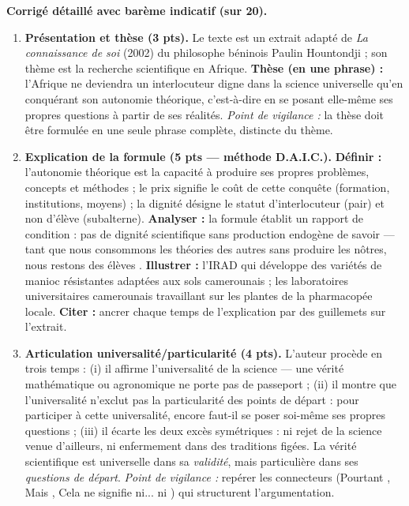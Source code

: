 \documentclass[11pt]{article}
\begin{document}
\begin{exoresolu}
\textbf{Corrigé détaillé avec barème indicatif (sur 20).}

\begin{enumerate}
\item \textbf{Présentation et thèse (3 pts).} Le texte est un extrait adapté de \emph{La connaissance de soi} (2002) du philosophe béninois Paulin Hountondji ; son thème est la recherche scientifique en Afrique. \textbf{Thèse (en une phrase) :} l'Afrique ne deviendra un interlocuteur digne dans la science universelle qu'en conquérant son autonomie théorique, c'est-à-dire en se posant elle-même ses propres questions à partir de ses réalités. \emph{Point de vigilance :} la thèse doit être formulée en une seule phrase complète, distincte du thème.
\item \textbf{Explication de la formule (5 pts — méthode D.A.I.C.).} \textbf{Définir :} l'\og autonomie théorique \fg est la capacité à produire ses propres problèmes, concepts et méthodes ; le \og prix \fg signifie le coût de cette conquête (formation, institutions, moyens) ; la \og dignité \fg désigne le statut d'interlocuteur (pair) et non d'élève (subalterne). \textbf{Analyser :} la formule établit un rapport de condition : pas de dignité scientifique sans production endogène de savoir — \og tant que nous consommons les théories des autres sans produire les nôtres, nous restons des élèves \fg. \textbf{Illustrer :} l'IRAD qui développe des variétés de manioc résistantes adaptées aux sols camerounais ; les laboratoires universitaires camerounais travaillant sur les plantes de la pharmacopée locale. \textbf{Citer :} ancrer chaque temps de l'explication par des guillemets sur l'extrait.
\item \textbf{Articulation universalité/particularité (4 pts).} L'auteur procède en trois temps : (i) il affirme l'universalité de la science — \og une vérité mathématique ou agronomique ne porte pas de passeport \fg ; (ii) il montre que l'universalité n'exclut pas la particularité des points de départ : \og pour participer à cette universalité, encore faut-il se poser soi-même ses propres questions \fg ; (iii) il écarte les deux excès symétriques : ni rejet de la science venue d'ailleurs, ni enfermement dans des traditions figées. La vérité scientifique est universelle dans sa \emph{validité}, mais particulière dans ses \emph{questions de départ}. \emph{Point de vigilance :} repérer les connecteurs (\og Pourtant \fg, \og Mais \fg, \og Cela ne signifie ni... ni \fg) qui structurent l'argumentation.

\end{enumerate}
\end{exoresolu}
\end{document}
